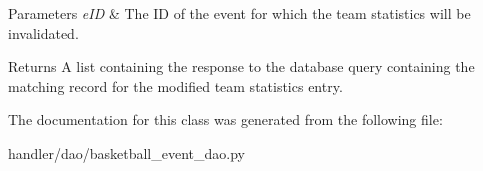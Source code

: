 \begin{DoxyParams}{Parameters}
{\em e\+ID} & The ID of the event for which the team statistics will be invalidated.\\
\hline
\end{DoxyParams}
\begin{DoxyReturn}{Returns}
A list containing the response to the database query containing the matching record for the modified team statistics entry. 
\end{DoxyReturn}


The documentation for this class was generated from the following file\+:\begin{DoxyCompactItemize}
\item 
handler/dao/basketball\+\_\+event\+\_\+dao.\+py\end{DoxyCompactItemize}
